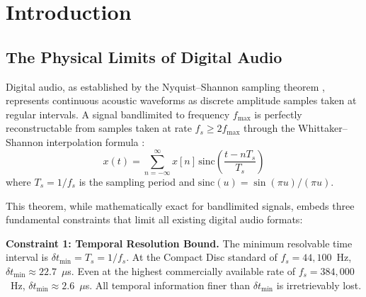 \documentclass[twocolumn,10pt]{article}
\theoremstyle{remark}
\begin{document}
\begin{abstract}
We develop the complete mathematical apparatus: the audio phase space and its symplectic structure, the categorical Hilbert space of audio states, the groove metric tensor on S-entropy space, the categorical Fourier transform bypassing Gabor uncertainty, the irreversibility theorem for audio processing chains, and the extension functor from finite signals to categorically-constrained continuations. All results follow from a single axiom---audio signals are bounded physical systems occupying finite phase space domains---with zero adjustable parameters.

\textbf{Keywords:} categorical audio, orthogonal information channel, trans-Nyquist resolution, Gabor bypass, groove metric, waveform extension, S-entropy coordinates, partition coordinates, categorical compression, digital audio format
\end{abstract}

\section{Introduction}
\label{sec:introduction}

\subsection{The Physical Limits of Digital Audio}

Digital audio, as established by the Nyquist--Shannon sampling theorem \cite{nyquist1928, shannon1949}, represents continuous acoustic waveforms as discrete amplitude samples taken at regular intervals. A signal bandlimited to frequency $f_{\max}$ is perfectly reconstructable from samples taken at rate $f_s \geq 2f_{\max}$ through the Whittaker--Shannon interpolation formula \cite{whittaker1915}:
\begin{equation}
    x(t) = \sum_{n=-\infty}^{\infty} x[n] \, \mathrm{sinc}\!\left(\frac{t - nT_s}{T_s}\right)
    \label{eq:sinc_interpolation}
\end{equation}
where $T_s = 1/f_s$ is the sampling period and $\mathrm{sinc}(u) = \sin(\pi u)/(\pi u)$.

This theorem, while mathematically exact for bandlimited signals, embeds three fundamental constraints that limit all existing digital audio formats:

\textbf{Constraint 1: Temporal Resolution Bound.} The minimum resolvable time interval is $\delta t_{\min} = T_s = 1/f_s$. At the Compact Disc standard of $f_s = 44{,}100$~Hz, $\delta t_{\min} \approx 22.7$~$\mu$s. Even at the highest commercially available rate of $f_s = 384{,}000$~Hz, $\delta t_{\min} \approx 2.6$~$\mu$s. All temporal information finer than $\delta t_{\min}$ is irretrievably lost.
\end{document}
